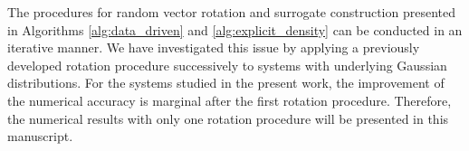 The procedures for random vector rotation and surrogate construction presented in  Algorithms \ref{alg:data_driven} and \ref{alg:explicit_density} can be conducted in an iterative manner.
We have investigated this issue \cite{Yang_Lei_JCP_2016} by applying a previously developed rotation procedure \cite{Lei_Yang_MMS_2015} successively to systems with underlying Gaussian distributions.
For the systems studied in the present work, the improvement of the numerical accuracy is marginal after the first rotation procedure.
Therefore, the numerical results with only one rotation procedure will be presented in this manuscript.

